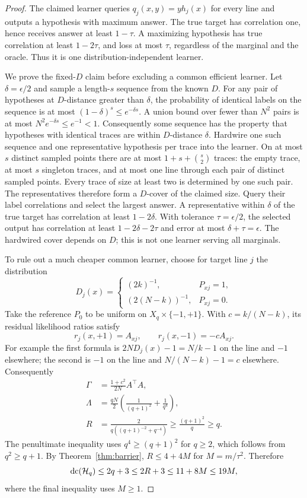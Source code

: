 \begin{proof}
The claimed learner queries $q_j(x,y)=y h_j(x)$ for every line and outputs a hypothesis with maximum answer. The true target has correlation one, hence receives answer at least $1-\tau$. A maximizing hypothesis has true correlation at least $1-2\tau$, and loss at most $\tau$, regardless of the marginal and the oracle. Thus it is one distribution-independent learner.

We prove the fixed-$D$ claim before excluding a common efficient learner. Let $\delta=\epsilon/2$ and sample a length-$s$ sequence from the known $D$. For any pair of hypotheses at $D$-distance greater than $\delta$, the probability of identical labels on the sequence is at most $(1-\delta)^s\leq e^{-\delta s}$. A union bound over fewer than $N^2$ pairs is at most $N^2e^{-\delta s}\leq e^{-1}<1$. Consequently some sequence has the property that hypotheses with identical traces are within $D$-distance $\delta$. Hardwire one such sequence and one representative hypothesis per trace into the learner. On at most $s$ distinct sampled points there are at most $1+s+\binom{s}{2}$ traces: the empty trace, at most $s$ singleton traces, and at most one line through each pair of distinct sampled points. Every trace of size at least two is determined by one such pair. The representatives therefore form a $D$-cover of the claimed size. Query their label correlations and select the largest answer. A representative within $\delta$ of the true target has correlation at least $1-2\delta$. With tolerance $\tau=\epsilon/2$, the selected output has correlation at least $1-2\delta-2\tau$ and error at most $\delta+\tau=\epsilon$. The hardwired cover depends on $D$; this is not one learner serving all marginals.

To rule out a much cheaper common learner, choose for target line $j$ the distribution
\[
 D_j(x)=\begin{cases}(2k)^{-1},&P_{xj}=1,\\[1mm]
 (2(N-k))^{-1},&P_{xj}=0.
 \end{cases}
\]
Take the reference $P_0$ to be uniform on $X_q\times\{-1,+1\}$. With $c=k/(N-k)$, its residual likelihood ratios satisfy
\[
 r_j(x,+1)=A_{xj},\qquad r_j(x,-1)=-cA_{xj}.
\]
For example the first formula is $2N D_j(x)-1=N/k-1$ on the line and $-1$ elsewhere; the second is $-1$ on the line and $N/(N-k)-1=c$ elsewhere. Consequently
\begin{align*}
 \Gamma&=\frac{1+c^2}{2N}A^\top A,\\
 \Lambda&=\frac{qN}{2}\left(\frac1{(q+1)^2}+\frac1{q^4}\right),\\
 R&=\frac{2}{q((q+1)^{-2}+q^{-4})}\geq\frac{(q+1)^2}{q}\geq q.
\end{align*}
The penultimate inequality uses $q^4\geq(q+1)^2$ for $q\geq2$, which follows from $q^2\geq q+1$. By Theorem~\ref{thm:barrier}, $R\leq4+4M$ for $M=m/\tau^2$. Therefore
\[
 \operatorname{dc}(\mathcal H_q)\leq2q+3\leq2R+3\leq11+8M\leq19M,
\]
where the final inequality uses $M\geq1$.
\end{proof}

